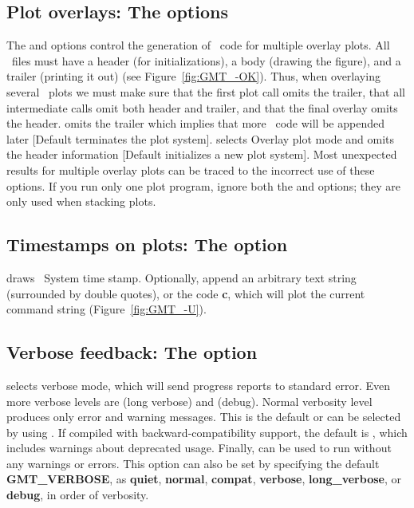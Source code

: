\subsection{Plot overlays: The   options}


The  and  options control the generation of \PS\ code for multiple
overlay plots.  All \PS\ files must have a header (for initializations),
a body (drawing the figure), and a trailer (printing it out) (see
Figure~\ref{fig:GMT_-OK}).  Thus,
when overlaying several \GMT\ plots we must make sure that the first plot
call omits the trailer, that all intermediate calls omit both header and
trailer, and that the final overlay omits the header.
 omits the trailer which implies that more \PS\ code will be appended
later [Default terminates the plot system].   selects Overlay plot
mode and omits the header information [Default initializes a new plot system].
Most unexpected results for multiple overlay plots can be traced to the
incorrect use of these options.  If you run only one plot
program, ignore both the  and  options; they are
only used when stacking plots.

\subsection{Timestamps on plots: The  option}

 draws \UNIX\ System time stamp.  Optionally, append an arbitrary
text string (surrounded by double quotes), or the code \textbf{c}, which will
plot the current command string (Figure~\ref{fig:GMT_-U}).


\subsection{Verbose feedback: The  option}
\label{sec:verbose}
 selects verbose mode, which will send progress reports to standard error.
Even more verbose levels are  (long verbose) and 
(debug). Normal verbosity level produces only error and warning messages. This is the default
or can be selected by using . If compiled with backward-compatibility support, the
default is , which includes warnings about deprecated usage. Finally,  can be used
to run without any warnings or errors.
This option can also be set by specifying the default \textbf{GMT\_VERBOSE}, as \textbf{quiet},
\textbf{normal}, \textbf{compat}, \textbf{verbose}, \textbf{long\_verbose}, or \textbf{debug}, in order
of verbosity.

